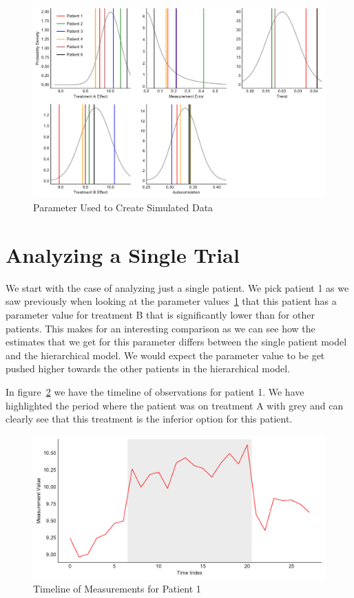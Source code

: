 \documentclass[12pt,a4paper,leqno]{report}
\theoremstyle{plain}
\theoremstyle{definition}
\theoremstyle{remark}
\begin{document}
\begin{figure}[H]
    \caption{Parameter Used to Create Simulated Data}
    \label{parameterdistribution}
    \includegraphics[width=\textwidth,height=\textheight,keepaspectratio]{population_parameter_distributions.pdf}
\end{figure}

\section{Analyzing a Single Trial}\label{1trial}

We start with the case of analyzing just a single patient. We pick patient 1 as we saw
previously when looking at the parameter values\ \ref{parameterdistribution} that this patient has a parameter value
for treatment B that is significantly lower than for other patients. This makes for an
interesting comparison as we can see how the estimates that we get for this parameter
differs between the single patient model and the hierarchical model. We would expect the
parameter value to be get pushed higher towards the other patients in the hierarchical
model.

In figure\ \ref{patient1timeline} we have the timeline of observations for patient 1. We
have highlighted the period where the patient was on treatment A with grey and can
clearly see that this treatment is the inferior option for this patient.

\begin{figure}[H]
    \caption{Timeline of Measurements for Patient 1}
    \label{patient1timeline}
    \includegraphics[width=\textwidth,height=\textheight,keepaspectratio]{patient1_timeline.pdf}
\end{figure}
\end{document}
